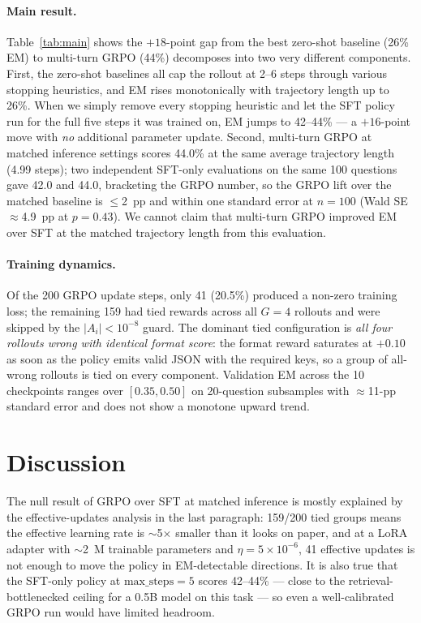 \documentclass[11pt]{article}
\begin{document}
\paragraph{Main result.}
Table~\ref{tab:main} shows the $+18$-point gap from the best
zero-shot baseline (26\% EM) to multi-turn GRPO (44\%) decomposes
into two very different components. First, the zero-shot
baselines all cap the rollout at 2--6 steps through various
stopping heuristics, and EM rises monotonically with trajectory
length up to 26\%. When we simply remove every stopping heuristic
and let the SFT policy run for the full five steps it was trained
on, EM jumps to 42--44\% --- a $+16$-point move with \emph{no}
additional parameter update. Second, multi-turn GRPO at matched
inference settings scores 44.0\% at the same average trajectory
length (4.99 steps); two independent SFT-only evaluations on the
same 100 questions gave 42.0 and 44.0, bracketing the GRPO number,
so the GRPO lift over the matched baseline is $\leq$2~pp and
within one standard error at $n{=}100$ (Wald SE $\approx$4.9~pp
at $p{=}0.43$). We cannot claim that multi-turn GRPO improved EM
over SFT at the matched trajectory length from this evaluation.

\paragraph{Training dynamics.}
Of the 200 GRPO update steps, only 41 (20.5\%) produced a
non-zero training loss; the remaining 159 had tied rewards
across all $G{=}4$ rollouts and were skipped by the
$|A_i|<10^{-8}$ guard. The dominant tied configuration is
\emph{all four rollouts wrong with identical format score}: the
format reward saturates at $+0.10$ as soon as the policy emits
valid JSON with the required keys, so a group of all-wrong
rollouts is tied on every component. Validation EM across the 10
checkpoints ranges over $[0.35, 0.50]$ on 20-question subsamples
with $\approx$11-pp standard error and does not show a monotone
upward trend.

\section{Discussion}
\label{sec:discussion}

The null result of GRPO over SFT at matched inference is mostly
explained by the effective-updates analysis in the last
paragraph: 159/200 tied groups means the effective learning rate
is $\sim$5$\times$ smaller than it looks on paper, and at a LoRA
adapter with $\sim$2~M trainable parameters and
$\eta{=}5{\times}10^{-6}$, 41 effective updates is not enough to
move the policy in EM-detectable directions. It is also true that
the SFT-only policy at $\mathrm{max\_steps}{=}5$ scores 42--44\% ---
close to the retrieval-bottlenecked ceiling for a 0.5B model on
this task --- so even a well-calibrated GRPO run would have
limited headroom.
\end{document}
